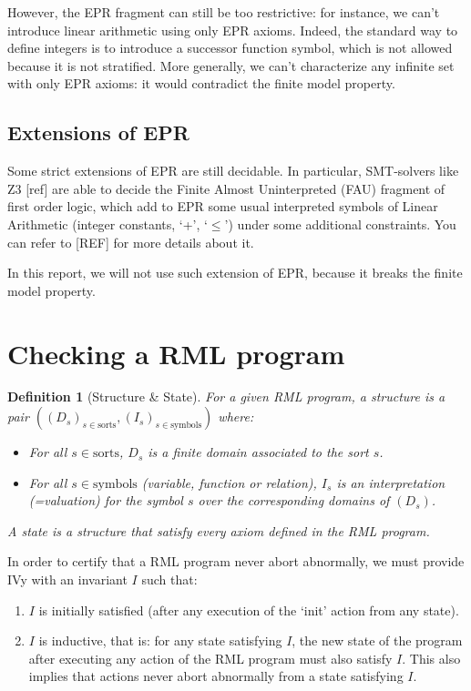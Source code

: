 \documentclass[11pt,a4paper,oldfontcommands,openany]{memoir}
\newtheorem*{definition}{Definition}
\begin{document}
        However, the EPR fragment can still be too restrictive: for instance, we can't introduce linear arithmetic using only EPR axioms.
        Indeed, the standard way to define integers is to introduce a successor function symbol, which is not allowed because it is not stratified.
        More generally, we can't characterize any infinite set with only EPR axioms: it would contradict the finite model property.

        \subsection{Extensions of EPR}

        Some strict extensions of EPR are still decidable.
        In particular, SMT-solvers like Z3 [ref] are able to decide the Finite Almost Uninterpreted (FAU) fragment of first order logic,
        which add to EPR some usual interpreted symbols of Linear Arithmetic (integer constants, `+', `\( \leq \)') under some additional constraints.
        You can refer to [REF] for more details about it. 
        
        In this report, we will not use such extension of EPR, because it breaks the finite model property.
    
    \section{Checking a RML program}

    \begin{definition}[Structure \& State]
        For a given RML program, a structure is a pair \(((D_s)_{s\in \text{sorts}}, (I_s)_{s\in \text{symbols}})\) where:
        \begin{itemize}
            \item For all \(s \in \text{sorts}\), \(D_s\) is a finite domain associated to the sort \(s\).
            \item For all \(s \in \text{symbols}\) (variable, function or relation), \(I_s\) is an interpretation (=valuation) for the symbol \(s\) over the corresponding domains of \((D_s)\).
        \end{itemize}
        A state is a structure that satisfy every axiom defined in the RML program.
    \end{definition}

    In order to certify that a RML program never abort abnormally, we must provide IVy with an invariant \(I\) such that:
    \begin{enumerate}
        \item \(I\) is initially satisfied (after any execution of the `init' action from any state).
        \item \(I\) is inductive, that is: for any state satisfying \(I\), the new state of the program after executing any action of the RML program must also satisfy \(I\).
        This also implies that actions never abort abnormally from a state satisfying \(I\).
    \end{enumerate}
\end{document}

